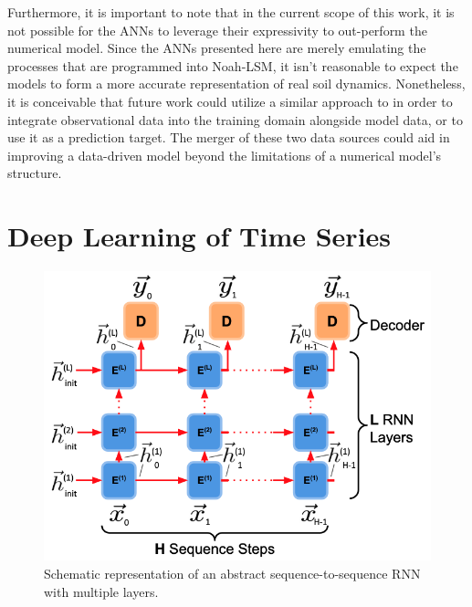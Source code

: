 Furthermore, it is important to note that in the current scope of this work, it is not possible for the ANNs to leverage their expressivity to out-perform the numerical model. Since the ANNs presented here are merely emulating the processes that are programmed into Noah-LSM, it isn't reasonable to expect the models to form a more accurate representation of real soil dynamics. Nonetheless, it is conceivable that future work could utilize a similar approach to \citep{o_global_2021} in order to integrate observational data into the training domain alongside model data, or to use it as a prediction target. The merger of these two data sources could aid in improving a data-driven model beyond the limitations of a numerical model's structure.

\section{Deep Learning of Time Series}

\begin{figure}[h!]
    \centering

    \includegraphics[width=.95\linewidth]{figures/schematic_abstract-rnn.png}

    \caption{Schematic representation of an abstract sequence-to-sequence RNN with multiple layers.}
    \label{schematic-rnn}
\end{figure}

